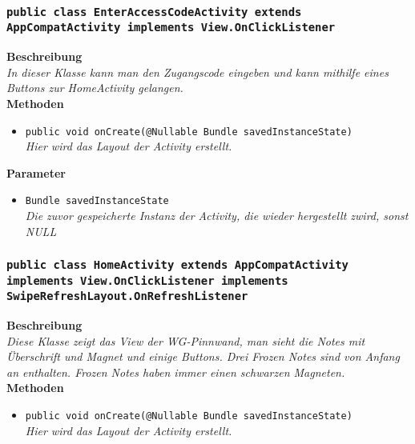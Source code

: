         \subsubsection{\texttt{public class EnterAccessCodeActivity extends AppCompatActivity implements View.OnClickListener}}
               
               	\textbf{Beschreibung} \\
      	        \textit{In dieser Klasse kann man den Zugangscode eingeben und kann mithilfe eines Buttons zur HomeActivity gelangen.} \\
                
                \textbf{Methoden}
                \begin{itemize}
        		\item\texttt{{public void onCreate(@Nullable Bundle savedInstanceState)}}\\
                \textit{Hier wird das Layout der Activity erstellt.}\\
                \end{itemize}
                
                \textbf{Parameter}
                \begin{itemize}
        		\item\texttt{Bundle savedInstanceState}\\ 
                \textit{Die zuvor gespeicherte Instanz der Activity, die wieder hergestellt zwird, sonst NULL}\\
                \end{itemize} 
                
        \subsubsection{\texttt{public class HomeActivity extends AppCompatActivity implements View.OnClickListener implements SwipeRefreshLayout.OnRefreshListener}}
               
               	\textbf{Beschreibung} \\
      	        \textit{Diese Klasse zeigt das View der WG-Pinnwand, man sieht die Notes mit Überschrift und Magnet und einige Buttons. Drei Frozen Notes sind von Anfang an enthalten. Frozen Notes haben immer einen schwarzen Magneten.} \\
                
                \textbf{Methoden}
                \begin{itemize}
        		\item\texttt{{public void onCreate(@Nullable Bundle savedInstanceState)}}\\
                \textit{Hier wird das Layout der Activity erstellt.}\\
                \end{itemize}
                
